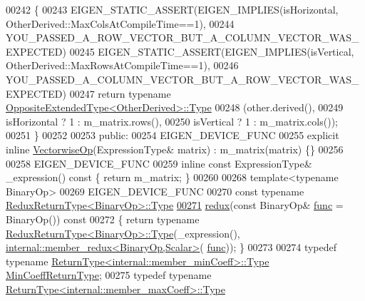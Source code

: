 \begin{DoxyCode}
00242 \textcolor{keyword}{    }\{
00243       EIGEN\_STATIC\_ASSERT(EIGEN\_IMPLIES(isHorizontal, OtherDerived::MaxColsAtCompileTime==1),
00244                           YOU\_PASSED\_A\_ROW\_VECTOR\_BUT\_A\_COLUMN\_VECTOR\_WAS\_EXPECTED)
00245       EIGEN\_STATIC\_ASSERT(EIGEN\_IMPLIES(isVertical, OtherDerived::MaxRowsAtCompileTime==1),
00246                           YOU\_PASSED\_A\_COLUMN\_VECTOR\_BUT\_A\_ROW\_VECTOR\_WAS\_EXPECTED)
00247       \textcolor{keywordflow}{return} \textcolor{keyword}{typename} \hyperlink{group___core___module_class_eigen_1_1_replicate}{OppositeExtendedType<OtherDerived>::Type}
00248                       (other.derived(),
00249                        isHorizontal  ? 1 : m\_matrix.rows(),
00250                        isVertical    ? 1 : m\_matrix.cols());
00251     \}
00252 
00253   \textcolor{keyword}{public}:
00254     EIGEN\_DEVICE\_FUNC
00255     \textcolor{keyword}{explicit} \textcolor{keyword}{inline} \hyperlink{group___core___module_class_eigen_1_1_vectorwise_op}{VectorwiseOp}(ExpressionType& matrix) : m\_matrix(matrix) \{\}
00256 
00258     EIGEN\_DEVICE\_FUNC
00259     \textcolor{keyword}{inline} \textcolor{keyword}{const} ExpressionType& \_expression()\textcolor{keyword}{ const }\{ \textcolor{keywordflow}{return} m\_matrix; \}
00260 
00268     \textcolor{keyword}{template}<\textcolor{keyword}{typename} BinaryOp>
00269     EIGEN\_DEVICE\_FUNC
00270     \textcolor{keyword}{const} \textcolor{keyword}{typename} \hyperlink{group___core___module_class_eigen_1_1_partial_redux_expr}{ReduxReturnType<BinaryOp>::Type}
\hyperlink{group___core___module_a798df97b5445eb6370fe5c90be2f7962}{00271}     \hyperlink{group___core___module_a798df97b5445eb6370fe5c90be2f7962}{redux}(\textcolor{keyword}{const} BinaryOp& \hyperlink{structfunc}{func} = BinaryOp())\textcolor{keyword}{ const}
00272 \textcolor{keyword}{    }\{ \textcolor{keywordflow}{return} \textcolor{keyword}{typename} \hyperlink{group___core___module_class_eigen_1_1_partial_redux_expr}{ReduxReturnType<BinaryOp>::Type}(\_expression(), 
      \hyperlink{struct_eigen_1_1internal_1_1member__redux}{internal::member\_redux<BinaryOp,Scalar>}(
      \hyperlink{structfunc}{func})); \}
00273 
00274     \textcolor{keyword}{typedef} \textcolor{keyword}{typename} \hyperlink{group___core___module_class_eigen_1_1_partial_redux_expr}{ReturnType<internal::member\_minCoeff>::Type}
       \hyperlink{group___core___module_class_eigen_1_1_partial_redux_expr}{MinCoeffReturnType};
00275     \textcolor{keyword}{typedef} \textcolor{keyword}{typename} \hyperlink{group___core___module_class_eigen_1_1_partial_redux_expr}{ReturnType<internal::member\_maxCoeff>::Type}

\end{DoxyCode}
